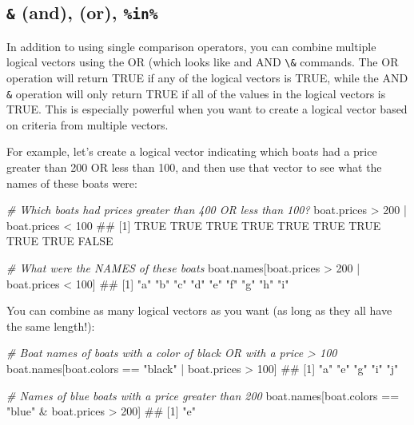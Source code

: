 \documentclass[]{book}
\newenvironment{Shaded}{\begin{snugshade}}{\end{snugshade}}
\newcommand{\DecValTok}[1]{\textcolor[rgb]{0.00,0.00,0.81}{{#1}}}
\newcommand{\StringTok}[1]{\textcolor[rgb]{0.31,0.60,0.02}{{#1}}}
\newcommand{\CommentTok}[1]{\textcolor[rgb]{0.56,0.35,0.01}{\textit{{#1}}}}
\newcommand{\NormalTok}[1]{{#1}}
\theoremstyle{definition}
\theoremstyle{definition}
\theoremstyle{remark}
\begin{document}
\subsection{\texorpdfstring{\texttt{\&} (and), \texttt{\textbar{}} (or),
\texttt{\%in\%}}{\& (and), \textbar{} (or), \%in\%}}\label{and-or-in}

In addition to using single comparison operators, you can combine
multiple logical vectors using the OR (which looks like
\texttt{\textbar{}} and AND \texttt{\textbackslash{}\&} commands. The OR
\texttt{\textbar{}} operation will return TRUE if any of the logical
vectors is TRUE, while the AND \texttt{\&} operation will only return
TRUE if all of the values in the logical vectors is TRUE. This is
especially powerful when you want to create a logical vector based on
criteria from multiple vectors.

For example, let's create a logical vector indicating which boats had a
price greater than 200 OR less than 100, and then use that vector to see
what the names of these boats were:

\begin{Shaded}
\begin{Highlighting}[]
\CommentTok{# Which boats had prices greater than 400 OR less than 100?}
\NormalTok{boat.prices >}\StringTok{ }\DecValTok{200} \NormalTok{|}\StringTok{ }\NormalTok{boat.prices <}\StringTok{ }\DecValTok{100}
\NormalTok{##  [1]  TRUE  TRUE  TRUE  TRUE  TRUE  TRUE  TRUE  TRUE  TRUE FALSE}

\CommentTok{# What were the NAMES of these boats}
\NormalTok{boat.names[boat.prices >}\StringTok{ }\DecValTok{200} \NormalTok{|}\StringTok{ }\NormalTok{boat.prices <}\StringTok{ }\DecValTok{100}\NormalTok{]}
\NormalTok{## [1] "a" "b" "c" "d" "e" "f" "g" "h" "i"}
\end{Highlighting}
\end{Shaded}

You can combine as many logical vectors as you want (as long as they all
have the same length!):

\begin{Shaded}
\begin{Highlighting}[]
\CommentTok{# Boat names of boats with a color of black OR with a price > 100}
\NormalTok{boat.names[boat.colors ==}\StringTok{ "black"} \NormalTok{|}\StringTok{ }\NormalTok{boat.prices >}\StringTok{ }\DecValTok{100}\NormalTok{]}
\NormalTok{## [1] "a" "e" "g" "i" "j"}

\CommentTok{# Names of blue boats with a price greater than 200}
\NormalTok{boat.names[boat.colors ==}\StringTok{ "blue"} \NormalTok{&}\StringTok{ }\NormalTok{boat.prices >}\StringTok{ }\DecValTok{200}\NormalTok{]}
\NormalTok{## [1] "e"}
\end{Highlighting}
\end{Shaded}
\end{document}
